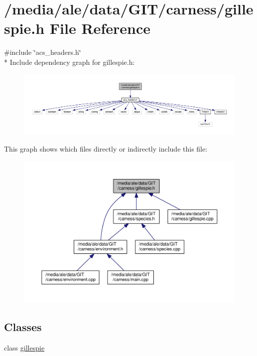 \hypertarget{a00074}{\section{/media/ale/data/\-G\-I\-T/carness/gillespie.h File Reference}
\label{a00074}
}
{\ttfamily \#include \char`\"{}acs\-\_\-headers.\-h\char`\"{}}\\*
Include dependency graph for gillespie.\-h\-:\nopagebreak
\begin{figure}[H]
\begin{center}
\leavevmode
\includegraphics[width=350pt]{a00143}
\end{center}
\end{figure}
This graph shows which files directly or indirectly include this file\-:\nopagebreak
\begin{figure}[H]
\begin{center}
\leavevmode
\includegraphics[width=350pt]{a00144}
\end{center}
\end{figure}
\subsection*{Classes}
\begin{DoxyCompactItemize}
\item 
class \hyperlink{a00004}{gillespie}
\end{DoxyCompactItemize}

